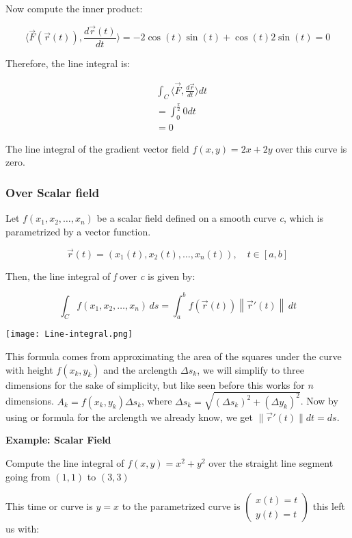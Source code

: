 Now compute the inner product:

\[
    \langle\vec{F}(\vec{r}(t)), \frac{d \vec{r}(t)}{dt}\rangle =
    -2\cos(t)\sin(t) + \cos(t)2\sin(t) = 0
\]

Therefore, the line integral is:

\begin{align*}
    &\int_C \langle \vec{F}, \frac{d\vec{r}}{dt}\rangle dt \\ 
    &= \int_0^{\frac{\pi}{2}}  0 dt \\
    &= 0
\end{align*}

The line integral of the gradient vector field \(f(x,y) = 2x + 2y \) over this curve is zero. 

\subsubsection{Over Scalar field}

Let \( f(x_1, x_2, \ldots, x_n) \) be a scalar field defined on a smooth curve \emph{c}, which 
is parametrized by a vector function.

\[
    \vec{r}(t) = (x_1(t), x_2(t), \ldots, x_n(t)), \quad t \in [a, b]
\]

Then, the line integral of \emph{f} over \emph{c} is given by:

\[
    \int_C f(x_1, x_2, \ldots, x_n) \, ds = \int_a^b f(\vec{r}(t)) \left\| \vec{r}'(t) \right\| \, dt
\]


\begin{center}
    \texttt{[image: Line-integral.png]}
\end{center}

This formula comes from approximating the area of the squares under the curve with height \(f(x_k, y_k)\) 
and the arclength \(\varDelta s_k\), we will simplify to three dimensions for the sake
of simplicity, but like seen before this works for \(n\) dimensions. 
\(A_k = f(x_k, y_k) \varDelta s_k\), where 
\(\varDelta s_k = \sqrt{(\varDelta s_k)^2 + (\varDelta y_k)^2} \). Now by using or formula 
for the arclength we already know, we get \(\|\vec{r}' (t)\| dt = ds\). 

\textbf{Example: Scalar Field}
\vspace{\baselineskip}

Compute the line integral of \(f(x,y) = x^2 + y^2\) over the straight line segment going
from \((1,1)\) to \((3,3)\)

This time or curve is \(y = x\) to the parametrized curve is \(\begin{pmatrix}
    x(t) = t \\ y(t) = t
\end{pmatrix}\) this left us with:

